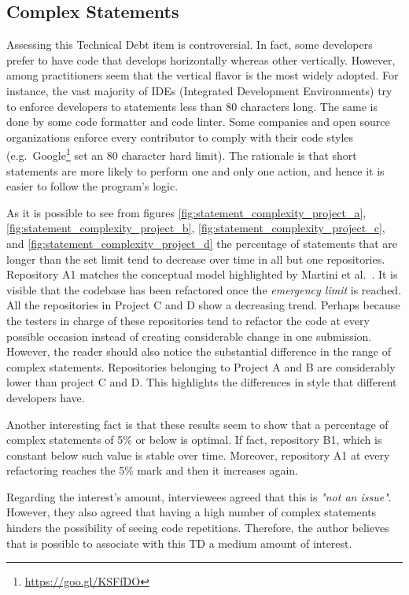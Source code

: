 	
	\subsection{Complex Statements}
	
	
	Assessing this Technical Debt item is controversial. In fact, some developers prefer to have code that develops horizontally whereas other vertically. However, among practitioners seem that the vertical flavor is the most widely adopted. For instance, the vast majority of IDEs (Integrated Development Environments) try to enforce developers to statements less than 80 characters long. The same is done by some code formatter and code linter. Some companies and open source organizations enforce every contributor to comply with their code styles (e.g.\ Google\footnote{\href{https://goo.gl/KSFfDO}{https://goo.gl/KSFfDO}} set an 80 character hard limit). The rationale is that short statements are more likely to perform one and only one action, and hence it is easier to follow the program's logic.

    As it is possible to see from figures \ref{fig:statement_complexity_project_a}, \ref{fig:statement_complexity_project_b}, \ref{fig:statement_complexity_project_c}, and \ref{fig:statement_complexity_project_d} the percentage of statements that are longer than the set limit tend to decrease over time in all but one repositories. Repository A1 matches the conceptual model highlighted by Martini et al.\ . It is visible that the codebase has been refactored once the \textit{emergency limit} is reached. All the repositories in Project C and D show a decreasing trend. Perhaps because the testers in charge of these repositories tend to refactor the code at every possible occasion instead of creating considerable change in one submission. However, the reader should also notice the substantial difference in the range of complex statements. Repositories belonging to Project A and B are considerably lower than project C and D. This highlights the differences in style that different developers have. 
    
    Another interesting fact is that these results seem to show that a percentage of complex statements of 5\% or below is optimal. If fact, repository B1, which is constant below such value is stable over time. Moreover, repository A1 at every refactoring reaches the 5\% mark and then it increases again.
    
    Regarding the interest's amount, interviewees agreed that this is \textit{"not an issue"}. However, they also agreed that having a high number of complex statements hinders the possibility of seeing code repetitions. Therefore, the author believes that is possible to associate with this TD a medium amount of interest.
    
